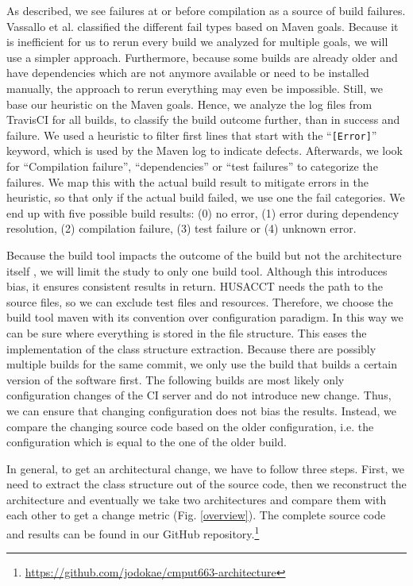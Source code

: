 \documentclass[sigplan, anonymous, review]{acmart}
\begin{document}
As described, we see failures at or before compilation as a source of build failures. 
Vassallo et al. \cite{CIFailTypes} classified the different fail types based on Maven goals. Because it is inefficient for us to rerun every build we analyzed for multiple goals, we will use a simpler approach. Furthermore, because some builds are already older and have dependencies which are not anymore available or need to be installed manually, the approach to rerun everything may even be impossible. Still, we base our heuristic on the Maven goals.
Hence, we analyze the log files from TravisCI for all builds, to classify the build outcome further, than in success and failure. We used a heuristic to filter first lines that start with the ``\texttt{[Error]}'' keyword, which is used by the Maven log to indicate defects. Afterwards, we look for ``Compilation failure'', ``dependencies'' or ``test failures'' to categorize the failures. We map this with the actual build result to mitigate errors in the heuristic, so that only if the actual build failed, we use one the fail categories. We end up with five possible build results: (0) no error, (1) error during dependency resolution, (2) compilation failure, (3) test failure or (4) unknown error. 

Because the build tool impacts the outcome of the build but not the architecture itself \cite{FailsCorr}, we will limit the study to only one build tool. Although this introduces bias, it ensures consistent results in return. HUSACCT needs the path to the source files, so we can exclude test files and resources. Therefore, we choose the build tool maven with its convention over configuration paradigm. In this way we can be sure where everything is stored in the file structure. This eases the implementation of the class structure extraction. 
Because there are possibly multiple builds for the same commit, we only use the build that builds a certain version of the software first. The following builds are most likely only configuration changes of the CI server and do not introduce new change. Thus, we can ensure that changing configuration does not bias the results. Instead, we compare the changing source code based on the older configuration, i.e. the configuration which is equal to the one of the older build. 

In general, to get an architectural change, we have to follow three steps. First, we need to extract the class structure out of the source code, then we reconstruct the architecture and eventually we take two architectures and compare them with each other to get a change metric (Fig. \ref{overview}). 
The complete source code and results can be found in our GitHub repository.\footnote{\url{https://github.com/jodokae/cmput663-architecture}}
\end{document}
